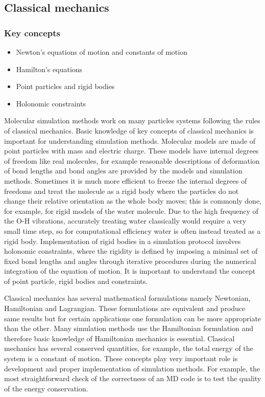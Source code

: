 \documentclass[9pt,bestpractices]{livecoms}
\begin{document}
\subsection{Classical mechanics}
\label{sec:classical_mechanics}
\subsubsection{Key concepts}
\begin{itemize}
\item Newton's equations of motion and constants of motion
\item Hamilton's equations
\item Point particles and rigid bodies
\item Holonomic constraints
\end{itemize}

Molecular simulation methods work on many particles systems following the rules of classical mechanics. Basic knowledge of key concepts of classical mechanics is important for understanding simulation methods.
Molecular models are made of point particles with mass and electric charge.
These models have internal degrees of freedom like real molecules, for example reasonable descriptions of deformation of bond lengths and bond angles are provided by the models and simulation methods. 
Sometimes it is much more efficient to freeze the internal degrees of freedoms and treat the molecule as a rigid body where the particles
do not change their relative orientation as the whole body moves; this is commonly done, for example, for rigid models of the water molecule.
Due to the high frequency of the O-H vibrations, accurately treating water classically would require a very small time step, so for computational efficiency water is often instead treated as a rigid body.
Implementation of rigid bodies in a simulation protocol  involves holonomic constraints, where the rigidity is defined by imposing a minimal set of fixed bond lengths and angles through iterative procedures during the numerical integration of the equation of motion.
It is important to understand the concept of point particle, rigid bodies and constraints.

Classical mechanics has several mathematical formulations namely Newtonian, Hamiltonian and Lagrangian. These formulations are equivalent and produce same results but for certain applications one formulation can be more appropriate
than the other. 
Many simulation methods use the Hamiltonian formulation and therefore basic knowledge of Hamiltonian mechanics is essential.
Classical mechanics has several conserved quantities, for example, the total energy of the
system is a constant of motion.
These concepts play very important role is development and proper implementation of simulation methods.
For example, the most straightforward check of the correctness of an MD code is to test the quality of the energy conservation.
\end{document}
